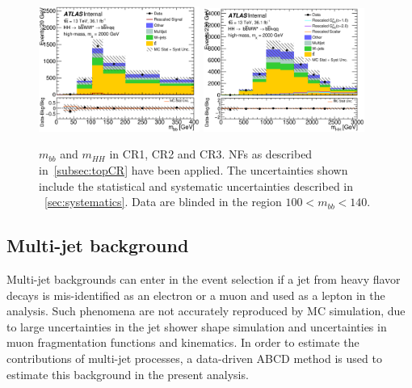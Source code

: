 \begin{figure}[!h]
\begin{center}
\includegraphics*[width=0.47\textwidth] {figures/ControlPlots_new/reOpt2000/C_reOpt2000_bbpt350_bbMass_regionA_met25d020}
\includegraphics*[width=0.47\textwidth] {figures/ControlPlots_new/reOpt2000/C_mBBcr_reOpt2000_bbpt350_hhMass_regionA_met25d020}

\caption[$m_{bb}$ and $m_{HH}$ in CR1, CR2 and CR3.]{$m_{bb}$ and $m_{HH}$ in CR1, CR2 and CR3.  \ttbar NFs as described in~\ref{subsec:topCR} have been applied. The uncertainties shown include the statistical and systematic uncertainties described in ~\ref{sec:systematics}. Data are blinded in the region $100 < m_{bb} < 140 $. }
\label{fig:mbb_mhh}
\end{center}
\end{figure}

\pagebreak
\subsection{Multi-jet background}

\label{sec:multijet}
Multi-jet backgrounds can enter in the event selection if a jet from
heavy flavor decays is mis-identified as an electron or a muon and used
as a lepton in the analysis. Such phenomena are not accurately reproduced by MC
simulation, due to large uncertainties in the jet shower shape simulation
and uncertainties in muon fragmentation functions and kinematics. In order 
to estimate the contributions of multi-jet processes, a data-driven ABCD 
method is used to estimate this background in the present analysis.

